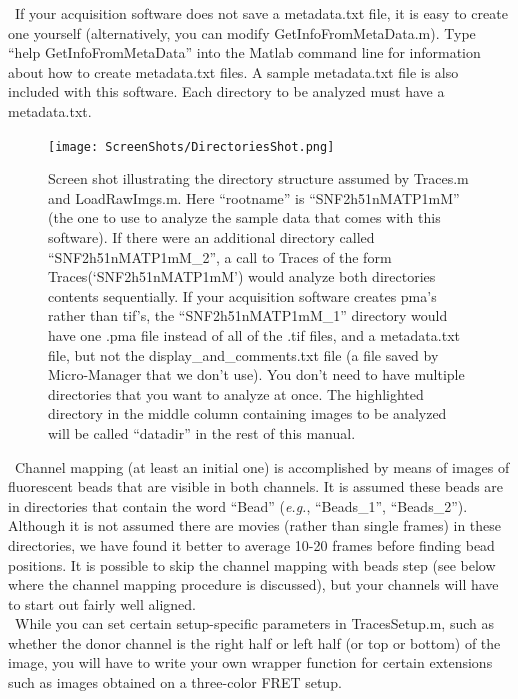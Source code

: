 \documentclass[11pt]{article}
\begin{document}
\noindent \textbullet~If your acquisition software does not save a metadata.txt file, it is easy to create one yourself (alternatively, you can modify GetInfoFromMetaData.m). Type ``help GetInfoFromMetaData'' into the Matlab command line for information about how to create metadata.txt files.  A sample metadata.txt file is also included with this software.  Each directory to be analyzed must have a metadata.txt.\\ 


\begin{figure}[!t]
\begin{center}
\texttt{[image: ScreenShots/DirectoriesShot.png]}
\caption{Screen shot illustrating the directory structure assumed by Traces.m and LoadRawImgs.m.  Here ``rootname'' is ``SNF2h51nMATP1mM''  (the one to use to analyze the sample data that comes with this software). If there were an additional directory called ``SNF2h51nMATP1mM\_2'', a call to Traces of the form Traces(`SNF2h51nMATP1mM') would analyze both directories contents sequentially.  If your acquisition software creates pma's rather than tif's, the ``SNF2h51nMATP1mM\_1'' directory would have one .pma file instead of all of the .tif files, and a metadata.txt file, but not the display\_and\_comments.txt file (a file saved by Micro-Manager that we don't use).  You don't need to have multiple directories that you want to analyze at once. The highlighted directory in the middle column containing images to be analyzed will be called ``datadir'' in the rest of this manual.}
\label{fig:DirectoryStructure}
\end{center}
\end{figure}

\noindent \textbullet~Channel mapping (at least an initial one) is accomplished by means of images of fluorescent beads that are visible in both channels. It is assumed these beads are in directories that contain the word ``Bead'' ({\it e.g.}, ``Beads\_1'', ``Beads\_2''). Although it is not assumed there are movies (rather than single frames) in these directories, we have found it better to average 10-20 frames before finding bead positions.  It is possible to skip the channel mapping with beads step (see below where the channel mapping procedure is discussed), but your channels will have to start out fairly well aligned.\\

\noindent \textbullet~While you can set certain setup-specific parameters in TracesSetup.m, such as whether the donor channel is the right half or left half (or top or bottom) of the image, you will have to write your own wrapper function for certain extensions such as images obtained on a three-color FRET setup.
\end{document}
